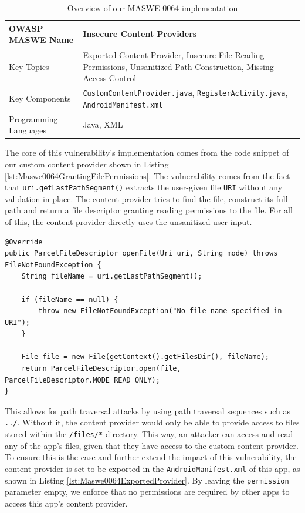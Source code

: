 \begin{table}[H]
    \centering
    \renewcommand{\arraystretch}{1.3}
        \begin{tabular}{p{5cm} p{8cm}} 
        \toprule
        OWASP MASWE Name & Insecure Content Providers \\ 
        \midrule
        Key Topics & Exported Content Provider, Insecure File Reading Permissions, Unsanitized Path Construction, Missing Access Control \\
        Key Components & \texttt{CustomContentProvider.java}, \texttt{RegisterActivity.java}, \texttt{AndroidManifest.xml} \\
        Programming Languages & Java, XML \\ 
        \bottomrule
        \end{tabular}
    \caption{Overview of our MASWE-0064 implementation}
    \label{tab:maswe-0064}
\end{table}

The core of this vulnerability's implementation comes from the code snippet of our custom content provider shown in Listing \ref{lst:Maswe0064GrantingFilePermissions}. The vulnerability comes from the fact that \texttt{uri.getLastPathSegment()} extracts the user-given file \texttt{URI} without any validation in place. The content provider tries to find the file, construct its full path and return a file descriptor granting reading permissions to the file. For all of this, the content provider directly uses the unsanitized user input.

\begin{lstlisting}[style=JavaStyle, float=tbh, captionpos=b, caption={Custom \texttt{ContentProvider} granting reading permission to user-requested file without path traversal checks or sanitizing the input}, label={lst:Maswe0064GrantingFilePermissions}]
@Override
public ParcelFileDescriptor openFile(Uri uri, String mode) throws FileNotFoundException {
    String fileName = uri.getLastPathSegment();

    if (fileName == null) {
        throw new FileNotFoundException("No file name specified in URI");
    }

    File file = new File(getContext().getFilesDir(), fileName);
    return ParcelFileDescriptor.open(file, ParcelFileDescriptor.MODE_READ_ONLY);
}
\end{lstlisting}

This allows for path traversal attacks by using path traversal sequences such as \texttt{../}. Without it, the content provider would only be able to provide access to files stored within the \texttt{/files/*} directory. This way, an attacker can access and read any of the app's files, given that they have access to the custom content provider.
To ensure this is the case and further extend the impact of this vulnerability, the content provider is set to be exported in the \texttt{AndroidManifest.xml} of this app, as shown in Listing \ref{lst:Maswe0064ExportedProvider}. By leaving the \texttt{permission} parameter empty, we enforce that no permissions are required by other apps to access this app's content provider.

